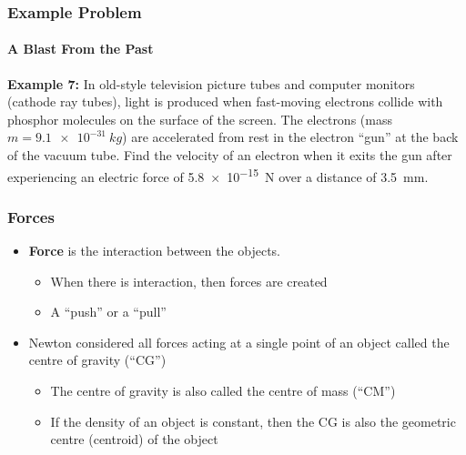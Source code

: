 \documentclass[12pt,compress,aspectratio=169]{beamer}
\begin{document}
\begin{frame}
  \frametitle{Example Problem}
  \framesubtitle{A Blast From the Past}
  \textbf{Example 7:} In old-style television picture tubes and computer
  monitors (cathode ray tubes), light is produced when fast-moving electrons
  collide with phosphor molecules on the surface of the screen. The electrons
  (mass $m=\SI{9.1e-31}{kg}$) are accelerated from rest in the electron ``gun''
  at the back of the vacuum tube. Find the velocity of an electron when it
  exits the gun after experiencing an electric force of \SI{5.8e-15}{N} over a
  distance of \SI{3.5}{mm}.
\end{frame}



\begin{frame}
  \frametitle{Forces}
  \begin{itemize}
  \item \textbf{Force} is the interaction between the objects.
    \begin{itemize}
    \item When there is interaction, then forces are created
    \item A ``push'' or a ``pull''
    \end{itemize}

  \item Newton considered all forces acting at a single point of an object
    called the centre of gravity (``CG'')
    \begin{itemize}
    \item The centre of gravity is also called the centre of mass (``CM'')
    \item If the density of an object is constant, then the CG is also the
      geometric centre (centroid) of the object
    \end{itemize}
  \end{itemize}
\end{frame}
\end{document}
